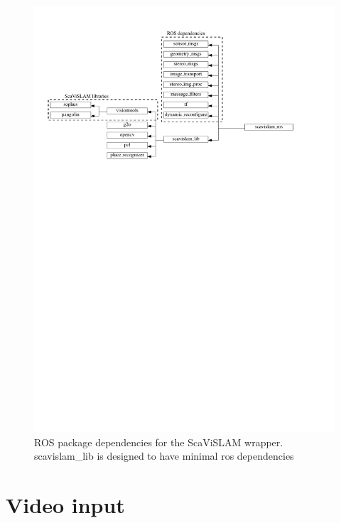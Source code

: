 \begin{figure}[h]
  \centering
    \includegraphics[width=1.0\textwidth]{chapters/images/ros_wrapper_dependencies}
  \caption{ROS package dependencies for the ScaViSLAM wrapper.  scavislam\_lib is designed to have minimal ros dependencies}
  \label{fig:scavislam_wrapper_dependencies}
\end{figure}


\section{Video input}

